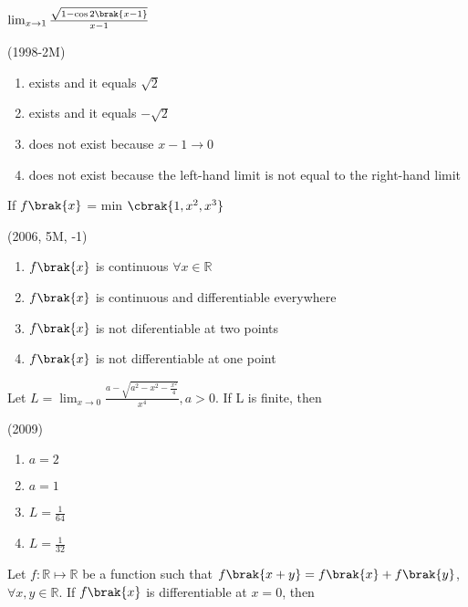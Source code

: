     \item 
    $\lim_{x \to1}\frac{\sqrt{1-\cos 2\brak{x-1}}}{x-1}$ 

    \hfill(1998-2M)
    
    \begin{enumerate}
        \item exists and it equals $\sqrt{2}$
        \item exists and it equals $-\sqrt{2}$
        \item does not exist because $x-1\to 0$
        \item does not exist because the left-hand limit is not equal to the right-hand limit
    \end{enumerate}


    \item 
    If $f\brak{x}$ = min $\cbrak{1,x^2,x^3}$ 

    \hfill(2006, 5M, -1)
    
    \begin{enumerate}
        \item $f\brak{x}$ is continuous $\forall x \in \mathbb{R}$
        \item $f\brak{x}$ is continuous and differentiable everywhere
        \item $f\brak{x}$ is not diferentiable at two points
        \item $f\brak{x}$ is not differentiable at one point
    \end{enumerate}

    \item 
    Let $L=\lim_{x \to0}\frac{a-\sqrt{a^2-x^2-\frac{x^2}{4}}}{x^4}, a>0$. If L is finite, then 

    \hfill(2009)
    
    \begin{multicols}{4}
    \begin{enumerate}
        \item $a=2$ 
        \item $a=1$
        \item $L=\frac{1}{64}$
        \item $L=\frac{1}{32}$
    \end{enumerate}
    \end{multicols}	    


    \item 
    Let $f:\mathbb{R} \mapsto \mathbb{R}$ be a function such that $f\brak{x+y}=f\brak{x}+f\brak{y}$, $\forall x,y\in \mathbb{R}$. If $f\brak{x}$ is differentiable at $x=0$, then 

